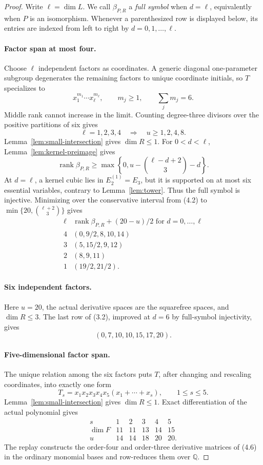 \documentclass[11pt]{amsart}
\newcommand{\rank}{\operatorname{rank}}
\theoremstyle{definition}
\begin{document}
\begin{proof}
Write \(\ell=\dim L\).
We call \(\beta_{P,R}\) a \emph{full symbol} when \(d=\ell\), equivalently
when \(P\) is an isomorphism. Whenever a parenthesized row is displayed below,
its entries are indexed from left to right by \(d=0,1,\ldots,\ell\).

\paragraph{Factor span at most four.}
Choose \(\ell\) independent factors as coordinates. A generic diagonal
one-parameter subgroup degenerates the remaining factors to unique coordinate
initials, so \(T\) specializes to
\[
 x_1^{m_1}\cdots x_\ell^{m_\ell},\qquad m_j\ge1,
 \qquad\sum_jm_j=6.
\]
Middle rank cannot increase in the limit. Counting degree-three divisors over
the positive partitions of six gives
\[
 \ell=1,2,3,4\quad\Longrightarrow\quad u\ge1,2,4,8. \tag{4.2}
\]
Lemma~\ref{lem:small-intersection} gives \(\dim R\le1\). For
\(0<d<\ell\), Lemma~\ref{lem:kernel-preimage} gives
\[
 \rank\beta_{P,R}\ge
 \max\left\{0,u-\binom{\ell-d+2}{3}-d\right\}. \tag{4.3}
\]
At \(d=\ell\), a kernel cubic lies in \(E_2^{(1)}=E_3\), but it is
supported on at most six essential variables, contrary to
Lemma~\ref{lem:tower}. Thus the full symbol is injective. Minimizing over the
conservative interval from (4.2) to
\(\min\{20,\binom{\ell+2}{3}\}\) gives
\[
\begin{array}{c|c}
\ell&\rank\beta_{P,R}+(20-u)/2\text{ for }d=0,\ldots,\ell\\ \hline
4&(0,9/2,8,10,14)\\
3&(5,15/2,9,12)\\
2&(8,9,11)\\
1&(19/2,21/2).
\end{array} \tag{4.4}
\]

\paragraph{Six independent factors.}
Here \(u=20\), the actual derivative spaces are the squarefree spaces, and
\(\dim R\le3\). The last row of (3.2), improved at \(d=6\) by full-symbol
injectivity, gives
\[
 (0,7,10,10,15,17,20). \tag{4.5}
\]

\paragraph{Five-dimensional factor span.}
The unique relation among the six factors puts \(T\), after changing and
rescaling coordinates, into exactly one form
\[
 T_s=x_1x_2x_3x_4x_5(x_1+\cdots+x_s),\qquad1\le s\le5. \tag{4.6}
\]
Lemma~\ref{lem:small-intersection} gives \(\dim R\le1\). Exact
differentiation of the actual polynomial gives
\[
\begin{array}{c|rrrrr}
s&1&2&3&4&5\\ \hline
\dim F&11&11&13&14&15\\
u&14&14&18&20&20.
\end{array} \tag{4.7}
\]
The replay constructs the order-four and order-three derivative matrices of
(4.6) in the ordinary monomial bases and row-reduces them over \(\mathbb Q\).


\end{proof}
\end{document}

